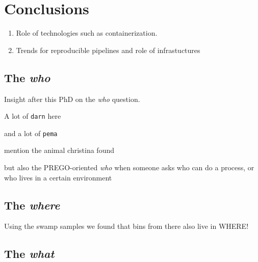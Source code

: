 % 
% 

\chapter{Conclusions}
\label{cha:conclusion}


\begin{enumerate}
   \item Role of technologies such as containerization. 
   \item Trends for reproducible pipelines and role of infrastuctures
\end{enumerate}



\section{The \textit{who}}

   Insight after this PhD on the \textit{who} question. 

   A lot of \texttt{darn} here

   and a lot of \texttt{pema}

   mention the animal christina found 


   but also the PREGO-oriented \textit{who} when
   someone asks who can do a process, or who lives 
   in a certain environment 




\section{The \textit{where}}

   Using the swamp samples we found that 
   bins from there also live in WHERE!




\section{The \textit{what}}



